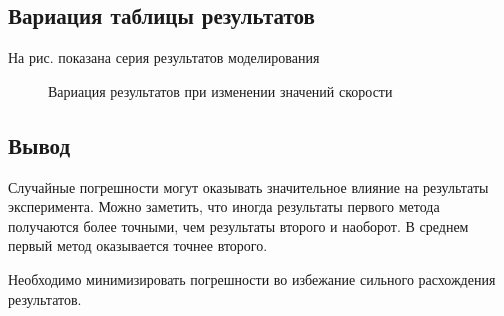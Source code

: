 \documentclass[14pt,a4paper]{extarticle}
\begin{document}
\subsection{Вариация таблицы результатов}
На рис.  показана серия результатов моделирования
\begin{figure}[H]
	\centering
	\caption{Вариация результатов при изменении значений скорости}\label{difference}
\end{figure}
\subsection{Вывод}
Случайные погрешности могут оказывать значительное влияние на результаты эксперимента. Можно заметить, что иногда результаты первого метода получаются более точными, чем результаты второго и наоборот. В среднем первый метод оказывается точнее второго. 

Необходимо минимизировать погрешности во избежание сильного расхождения результатов.
\end{document}
